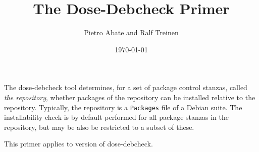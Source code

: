 \documentclass{article}
\title{The Dose-Debcheck Primer}
\author{Pietro Abate and Ralf Treinen}
\date{\today}
\newcommand{\debcheck}{dose-debcheck}
\begin{document}
\maketitle

The \debcheck{} tool determines, for a set of package control stanzas,
called \emph{the repository}, whether packages of the repository can
be installed relative to the repository. Typically, the repository is
a \texttt{Packages} file of a Debian suite. The installability check
is by default performed for all package stanzas in the repository, but
may be also be restricted to a subset of these.

This primer applies to version \version{} of \debcheck. 

\tableofcontents













\end{document}
